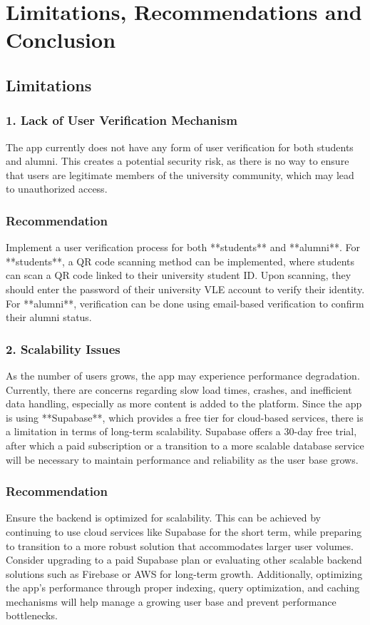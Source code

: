 \documentclass[12pt, a4paper]{report}
\begin{document}
\chapter{Limitations, Recommendations and Conclusion}

\section*{Limitations}

\subsection*{1. Lack of User Verification Mechanism}
The app currently does not have any form of user verification for both students and alumni. This creates a potential security risk, as there is no way to ensure that users are legitimate members of the university community, which may lead to unauthorized access.

\subsection*{Recommendation}
Implement a user verification process for both **students** and **alumni**. For **students**, a QR code scanning method can be implemented, where students can scan a QR code linked to their university student ID. Upon scanning, they should enter the password of their university VLE account to verify their identity. For **alumni**, verification can be done using email-based verification to confirm their alumni status.

\subsection*{2. Scalability Issues}
As the number of users grows, the app may experience performance degradation. Currently, there are concerns regarding slow load times, crashes, and inefficient data handling, especially as more content is added to the platform. Since the app is using **Supabase**, which provides a free tier for cloud-based services, there is a limitation in terms of long-term scalability. Supabase offers a 30-day free trial, after which a paid subscription or a transition to a more scalable database service will be necessary to maintain performance and reliability as the user base grows.

\subsection*{Recommendation}
Ensure the backend is optimized for scalability. This can be achieved by continuing to use cloud services like Supabase for the short term, while preparing to transition to a more robust solution that accommodates larger user volumes. Consider upgrading to a paid Supabase plan or evaluating other scalable backend solutions such as Firebase or AWS for long-term growth. Additionally, optimizing the app’s performance through proper indexing, query optimization, and caching mechanisms will help manage a growing user base and prevent performance bottlenecks.
\end{document}
